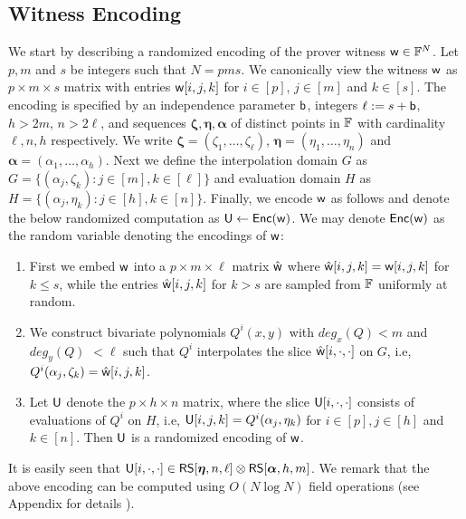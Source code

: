 
\subsection{Witness Encoding}\label{sec:witencoding}
We start by describing a randomized encoding of the prover witness $\mathsf{w}\in \mathbb{F}^N$. Let $p,m$ and
$s$ be integers such that $N=pms$. We canonically view the
witness $\mathsf{w}$ 
as $p\times m\times s$ matrix with entries $\mathsf{w}[i,j,k]$ for $i\in [p]$,
$j\in [m]$ and $k\in [s]$. The encoding is specified by an independence 
parameter $\mathsf{b}$, integers $\ell := s+\mathsf{b}$, $h>2m$, $n>2\ell$, and sequences
$\bm{\zeta},\bm{\eta},\bm{\alpha}$ of distinct points in $\mathbb{F}$ with cardinality 
$\ell,n,h$ respectively. We write $\bm{\zeta}=(\zeta_1,\ldots,\zeta_\ell)$,
$\bm{\eta}=(\eta_1,\ldots,\eta_n)$ and $\bm{\alpha}=(\alpha_1,\ldots,\alpha_h)$. 
Next we define the interpolation domain $G$ as $G=\{(\alpha_j,\zeta_k): j\in[m],
k\in [\ell]\}$ and evaluation domain $H$ as $H=\{(\alpha_j,\eta_k): j\in [h],
k\in [n]\}$. Finally, we encode $\mathsf{w}$ as follows and denote the below randomized computation as $\mathsf{U}\gets \mathsf{Enc}(\mathsf{w})$.
 We may denote $\mathsf{Enc}(\mathsf{w})$ as the random variable denoting the encodings of $\mathsf{w}$:
\begin{enumerate}[{\rm (i)}]
\item First we embed $\mathsf{w}$ into a $p\times m\times \ell$ matrix $\hat{\mathsf{w}}$
where $\hat{\mathsf{w}}[i,j,k]=\mathsf{w}[i,j,k]$ for $k\leq s$, while the entries
$\hat{\mathsf{w}}[i,j,k]$ for $k>s$ are sampled from $\mathbb{F}$ uniformly at random.
\item We construct bivariate polynomials $Q^i(x,y)$ with $deg_x(Q)<m$ and
$deg_y(Q) $ $<\ell$ such that $Q^i$ interpolates the slice
$\hat{\mathsf{w}}[i,\cdot,\cdot]$ on $G$, i.e,
$Q^i(\alpha_j,\zeta_k)=\hat{\mathsf{w}}[i,j,k]$. 
\item Let $\mathsf{U}$ denote the $p\times h\times n$ matrix, where the slice
$\mathsf{U}[i,\cdot,\cdot]$ consists of evaluations of $Q^i$ on $H$, i.e,
$\mathsf{U}[i,j,k]=Q^i(\alpha_j,\eta_k)$ for $i\in [p], j\in [h]$ and $k\in [n]$.
Then $\mathsf{U}$ is a randomized encoding of $\mathsf{w}$.
\end{enumerate}
 It is easily seen
that $\mathsf{U}[i,\cdot,\cdot]\in \mathsf{RS}[\bm{\eta},n,\ell]\otimes \mathsf{RS}[\bm{\alpha},h,m]$. We remark that the above
encoding can be computed using $O(N\log N)$ field operations (see Appendix for
details ).
